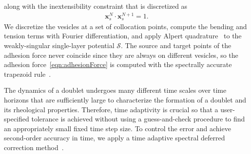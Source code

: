 \documentclass[prf,superscriptaddress,showpacs]{revtex4-1}
\renewcommand{\SS}{\mathcal{S}}
\newcommand{\xx}{\mathbf{x}}
\begin{document}
along with the inextensibility constraint that is discretized as
\begin{align*}
  \xx_s^{N} \cdot \xx_{s}^{N+1} = 1.
\end{align*}
We discretize the vesicles at a set of collocation points, compute the
bending and tension terms with Fourier differentiation, and apply Alpert
quadrature~\cite{alp1999} to the weakly-singular single-layer potential
$\SS$.  The source and target points of the adhesion force never
coincide since they are always on different vesicles, so the adhesion
force~\eqref{eqn:adhesionForce} is computed with the spectrally accurate
trapezoid rule~\cite{tre-wei2014}.  

The dynamics of a doublet undergoes many different time scales over time
horizons that are sufficiently large to characterize the formation of a
doublet and its rheological properties.  Therefore, time adaptivity is
crucial so that a user-specified tolerance is achieved without using a
guess-and-check procedure to find an appropriately small fixed time step
size.  To control the error and achieve second-order accuracy in time,
we apply a time adaptive spectral deferred correction
method~\cite{quaife2016adaptive}. 

\end{document}
